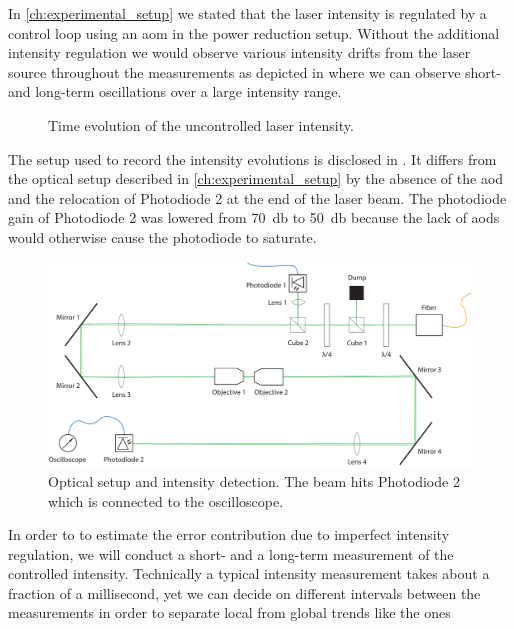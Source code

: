 In \cref{ch:experimental_setup} we stated that the laser intensity is
regulated by a control loop using an \gls{aom} in the power reduction setup.
Without the additional intensity regulation we would
observe various intensity drifts from the laser source throughout the
measurements as depicted in  where we can
observe short- and long-term oscillations over a large intensity range.
\begin{figure}[htb]
  \centering
  \begin{adjustbox}{width=\textwidth}
    
  \end{adjustbox}
  \caption{Time evolution of the uncontrolled laser intensity.
  }\label{fig:intensity_uncontrolled}
\end{figure}
The setup used to record the intensity evolutions is disclosed in
. It differs from the optical setup
described in \cref{ch:experimental_setup} by the absence of the \gls{aod}
and the relocation of Photodiode 2 at the end of the laser beam. The
photodiode gain of Photodiode 2 was lowered from \SI{70}{\decibel} to
\SI{50}{\decibel} because the lack of \gls{aod}s would otherwise cause the
photodiode to saturate.
\begin{figure}[htb]
  \centering
  \includegraphics[width=\textwidth]{../media/setup/intensity-control.pdf}
  \caption{Optical setup and intensity detection. The beam hits Photodiode 2
    which is connected to the oscilloscope.
  }\label{fig:intensity_control_setup}
\end{figure}
In order to to estimate the error contribution due to imperfect intensity
regulation, we will conduct a short- and a long-term measurement of the
controlled intensity. Technically a typical intensity measurement takes about
a fraction of a millisecond, yet we can decide on different intervals between
the measurements in order to separate local from global trends like the ones
